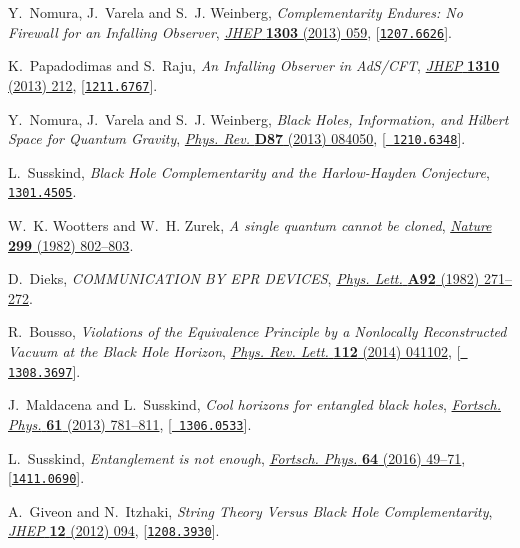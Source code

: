 \documentclass[10pt]{article}
\begin{document}
\begin{thebibliography}{100}
Y.~Nomura, J.~Varela and S.~J. Weinberg, \emph{{Complementarity Endures: No
  Firewall for an Infalling Observer}},
  \href{http://dx.doi.org/10.1007/JHEP03(2013)059}{\emph{JHEP} {\bf 1303}
  (2013) 059}, [\href{http://arxiv.org/abs/1207.6626}{{\tt 1207.6626}}].

K.~Papadodimas and S.~Raju, \emph{{An Infalling Observer in AdS/CFT}},
  \href{http://dx.doi.org/10.1007/JHEP10(2013)212}{\emph{JHEP} {\bf 1310}
  (2013) 212}, [\href{http://arxiv.org/abs/1211.6767}{{\tt 1211.6767}}].

Y.~Nomura, J.~Varela and S.~J. Weinberg, \emph{{Black Holes, Information, and
  Hilbert Space for Quantum Gravity}},
  \href{http://dx.doi.org/10.1103/PhysRevD.87.084050}{\emph{Phys. Rev.} {\bf
  D87} (2013) 084050}, [\href{http://arxiv.org/abs/1210.6348}{{\tt
  1210.6348}}].

L.~Susskind, \emph{{Black Hole Complementarity and the Harlow-Hayden
  Conjecture}},  \href{http://arxiv.org/abs/1301.4505}{{\tt 1301.4505}}.

W.~K. Wootters and W.~H. Zurek, \emph{{A single quantum cannot be cloned}},
  \href{http://dx.doi.org/10.1038/299802a0}{\emph{Nature} {\bf 299} (1982)
  802--803}.

D.~Dieks, \emph{{COMMUNICATION BY EPR DEVICES}},
  \href{http://dx.doi.org/10.1016/0375-9601(82)90084-6}{\emph{Phys. Lett.} {\bf
  A92} (1982) 271--272}.

R.~Bousso, \emph{{Violations of the Equivalence Principle by a Nonlocally
  Reconstructed Vacuum at the Black Hole Horizon}},
  \href{http://dx.doi.org/10.1103/PhysRevLett.112.041102}{\emph{Phys. Rev.
  Lett.} {\bf 112} (2014) 041102}, [\href{http://arxiv.org/abs/1308.3697}{{\tt
  1308.3697}}].

J.~Maldacena and L.~Susskind, \emph{{Cool horizons for entangled black holes}},
  \href{http://dx.doi.org/10.1002/prop.201300020}{\emph{Fortsch. Phys.} {\bf
  61} (2013) 781--811}, [\href{http://arxiv.org/abs/1306.0533}{{\tt
  1306.0533}}].

L.~Susskind, \emph{{Entanglement is not enough}},
  \href{http://dx.doi.org/10.1002/prop.201500095}{\emph{Fortsch. Phys.} {\bf
  64} (2016) 49--71}, [\href{http://arxiv.org/abs/1411.0690}{{\tt 1411.0690}}].

A.~Giveon and N.~Itzhaki, \emph{{String Theory Versus Black Hole
  Complementarity}},
  \href{http://dx.doi.org/10.1007/JHEP12(2012)094}{\emph{JHEP} {\bf 12} (2012)
  094}, [\href{http://arxiv.org/abs/1208.3930}{{\tt 1208.3930}}].


\end{thebibliography}
\end{document}
